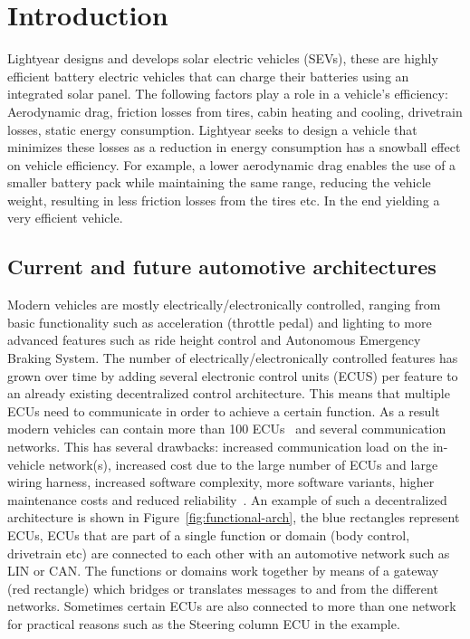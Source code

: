 \section{Introduction}
\label{sec:introduction}
Lightyear designs and develops solar electric vehicles (SEVs), these are highly efficient battery electric vehicles that can charge their batteries using an integrated solar panel. The following factors play a role in a vehicle's efficiency: Aerodynamic drag, friction losses from tires, cabin heating and cooling, drivetrain losses, static energy consumption. Lightyear seeks to design a vehicle that minimizes these losses as a reduction in energy consumption has a snowball effect on vehicle efficiency. For example, a lower aerodynamic drag enables the use of a smaller battery pack while maintaining the same range, reducing the vehicle weight, resulting in less friction losses from the tires etc. In the end yielding a very efficient vehicle.

\subsection{Current and future automotive architectures}
Modern vehicles are mostly electrically/electronically controlled, ranging from basic functionality such as acceleration (throttle pedal) and lighting to more advanced features such as ride height control and Autonomous Emergency Braking System. The number of electrically/electronically controlled features has grown over time by adding several electronic control units (ECUS) per feature to an already existing decentralized control architecture. This means that multiple ECUs need to communicate in order to achieve a certain function. As a result modern vehicles can contain more than 100 ECUs~\cite{bandur2021making} and several communication networks. This has several drawbacks: increased communication load on the in-vehicle network(s), increased cost due to the large number of ECUs and large wiring harness, increased software complexity, more software variants, higher maintenance costs and reduced reliability~\cite{bandur2021making}. An example of such a decentralized architecture is shown in Figure~\ref{fig:functional-arch}, the blue rectangles represent ECUs, ECUs that are part of a single function or domain (body control, drivetrain etc) are connected to each other with an automotive network such as LIN or CAN. The functions or domains work together by means of a gateway (red rectangle) which bridges or translates messages to and from the different networks. Sometimes certain ECUs are also connected to more than one network for practical reasons such as the Steering column ECU in the example.


